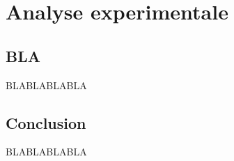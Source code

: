 \chapter{Analyse experimentale}

\section{BLA}

BLABLABLABLA



\section{Conclusion}%
BLABLABLABLA

